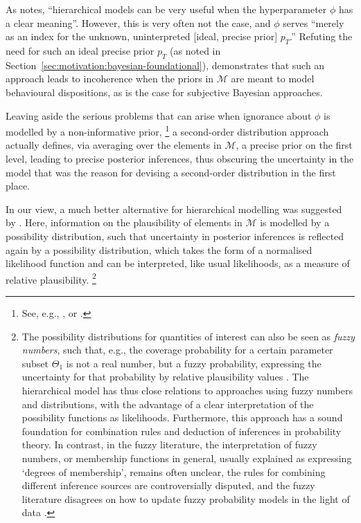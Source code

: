 As \textcite[\S 5.10.4, p.~260]{1991:walley} notes,
``hierarchical models can be very useful when the hyperparameter $\phi$ has a clear meaning''.
However, this is very often not the case, and $\phi$ serves 
``merely as an index for the unknown, uninterpreted [ideal, precise prior] $p_T$.''
Refuting the need for such an ideal precise prior $p_T$ (as noted in Section~\ref{sec:motivation:bayesian-foundational}),
\textcite[\S 5.10.2]{1991:walley} demonstrates that such an approach leads to incoherence
when the priors in $\mathcal{M}$ are meant to model behavioural dispositions,
as is the case for subjective Bayesian approaches.

Leaving aside the serious problems that can arise when ignorance about $\phi$ is modelled by a non-informative prior,%
\footnote{See, e.g., \textcite[\S 5.5.4 (h)]{1991:walley}, or \textcite[p.~367]{1988:pericchi:nazareth}.}
a second-order distribution approach actually defines, via averaging over the elements in $\mathcal{M}$,
a precise prior on the first level, leading to precise posterior inferences,
thus obscuring the uncertainty in the model that was the reason
for devising a second-order distribution in the first place.

In our view, a much better alternative for hierarchical modelling was suggested by \textcite{2008:cattaneo}.
Here, information on the plausibility of elements in $\mathcal{M}$ is modelled
by a possibility distribution, such that uncertainty in posterior inferences is reflected
again by a possibility distribution, which takes the form of a normalised likelihood function
and can be interpreted, like usual likelihoods, as a measure of relative plausibility.%
\footnote{The possibility distributions for quantities of interest can also be seen
as \emph{fuzzy numbers}, such that, e.g.,
the coverage probability for a certain parameter subset $\Theta_1$ is not a real number,
but a fuzzy probability, expressing the uncertainty for that probability by relative plausibility values \parencite{2008:cattaneo}.
The hierarchical model has thus close relations to approaches using fuzzy numbers and distributions,
with the advantage of a clear interpretation of the possibility functions as likelihoods.
Furthermore, this approach has a sound foundation for combination rules and deduction of inferences in probability theory.
In contrast, in the fuzzy literature, the interpretation of fuzzy numbers, or membership functions in general,
usually explained as expressing `degrees of membership', remains often unclear, %
the rules for combining different inference sources are controversially disputed,
and the fuzzy literature disagrees on how to update fuzzy probability models in the light of data
\parencite[\S 3]{2008:cattaneo}.}

